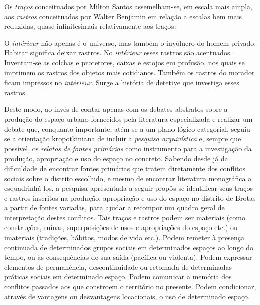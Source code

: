 Os \textit{traços} conceituados por Milton Santos assemelham-se, em escala mais ampla, aos \textit{rastros} conceituados por Walter Benjamin em relação a escalas bem mais reduzidas, quase infinitesimais relativamente aos traços:

\begin{citacao}
O \textit{intérieur} não apenas é o universo, mas também o invólucro do homem privado. Habitar significa deixar rastros. No \textit{intérieur} esses rastros são acentuados. Inventam-se as colchas e protetores, caixas e estojos em profusão, nos quais se imprimem os rastros dos objetos mais cotidianos. Também os rastros do morador ficam impressos no \textit{intérieur}. Surge a história de detetive que investiga esses rastros. \cite[p.~46]{benjamin_passagens_2006}
\end{citacao}

Deste modo, ao invés de contar apenas com os debates abstratos sobre a produção do espaço urbano fornecidos pela literatura especializada e realizar um debate que, conquanto importante, atém-se a um plano lógico-categorial, seguiu-se a orientação kropotkiniana de incluir a \textit{pesquisa arquivística} e, sempre que possível, os \textit{relatos de fontes primárias} como instrumento para a investigação da produção, apropriação e uso do espaço no concreto. Sabendo desde já da dificuldade de encontrar fontes primárias que tratem diretamente dos conflitos sociais sobre o distrito escolhido, e mesmo de encontrar literatura monográfica a esquadrinhá-los, a pesquisa apresentada a seguir propôs-se identificar seus traços e rastros inscritos na produção, apropriação e uso do espaço no distrito de Brotas a partir de fontes variadas, para ajudar a recompor um quadro geral de interpretação destes conflitos. Tais traços e rastros podem ser materiais (como construções, ruínas, superposições de usos e apropriações do espaço etc.) ou imateriais (tradições, hábitos, modos de vida etc.). Podem remeter à presença continuada de determinados grupos sociais em determinados espaços ao longo do tempo, ou às consequências de sua saída (pacífica ou violenta). Podem expressar elementos de permanência, descontinuidade ou retomada de determinadas práticas sociais em determinado espaço. Podem comunicar a memória dos conflitos passados aos que constroem o território no presente. Podem condicionar, através de vantagens ou desvantagens locacionais, o uso de determinado espaço. 

